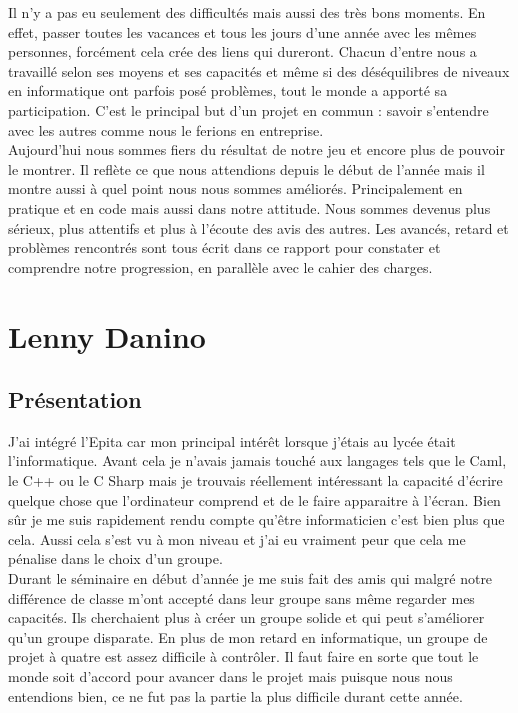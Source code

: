 \documentclass[12pt]{article}
\begin{document}
Il n’y a pas eu seulement des difficultés mais aussi des très bons moments. En effet, passer toutes les vacances et tous les jours  d’une année avec les mêmes personnes, forcément cela crée des liens qui dureront. Chacun d’entre nous a travaillé selon ses moyens et ses capacités et même si des déséquilibres de niveaux en informatique ont parfois posé problèmes, tout le monde a apporté sa participation. C’est le principal but d’un projet en commun : savoir s’entendre avec les autres comme nous le ferions en entreprise.\\

Aujourd’hui nous sommes fiers du résultat  de notre jeu et encore plus de pouvoir le montrer. Il reflète ce que nous attendions depuis le début de l’année mais il montre aussi à quel point nous nous sommes améliorés. Principalement en pratique et en code mais aussi dans notre attitude. Nous sommes devenus plus sérieux, plus attentifs et plus à l'écoute des avis des autres. Les avancés, retard et problèmes rencontrés sont tous écrit dans ce rapport pour constater et comprendre notre progression, en parallèle avec le cahier des charges.\\

\newpage
\setcounter{page}{1} 
\section{Lenny Danino}

\subsection{Présentation}

J’ai intégré l’Epita car mon principal intérêt lorsque j’étais au lycée était l’informatique. Avant cela je n’avais jamais touché aux langages tels que le Caml, le C++ ou le C Sharp mais je trouvais réellement intéressant la capacité d’écrire quelque chose que l’ordinateur comprend et de le faire apparaitre à l’écran. Bien sûr je me suis rapidement rendu compte qu’être informaticien c’est bien plus que cela. Aussi cela s’est vu à mon niveau et j’ai eu vraiment peur que cela me pénalise dans le choix d’un groupe.\\

Durant le séminaire en début d’année je me suis fait des amis qui malgré notre différence de classe m’ont accepté dans leur groupe sans même regarder mes capacités. Ils cherchaient plus à créer un groupe solide et qui peut s’améliorer qu’un groupe disparate. En plus de mon retard en informatique, un groupe de projet à quatre est assez difficile à contrôler. Il faut faire en sorte que tout le monde soit d’accord pour avancer dans le projet mais puisque nous nous entendions bien, ce ne fut pas la partie la plus difficile durant cette année.\\
\end{document}
